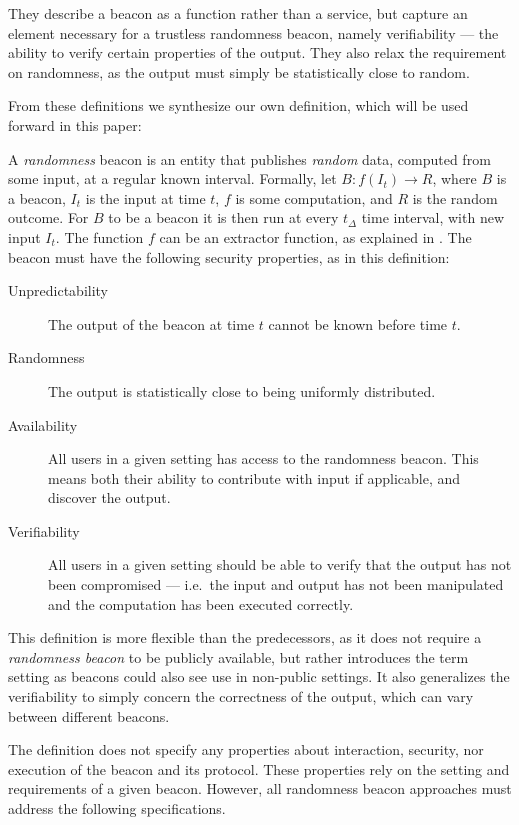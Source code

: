 They describe a beacon as a function rather than a service, but capture an element necessary for a trustless randomness beacon, namely verifiability --- the ability to verify certain properties of the output.
They also relax the requirement on randomness, as the output must simply be statistically close to random.

From these definitions we synthesize our own definition, which will be used forward in this paper:

A \emph{randomness} beacon is an entity that publishes \emph{random} data, computed from some input, at a regular known interval.
Formally, let $B: f(I_t) \rightarrow R$, where $B$ is a beacon, $I_t$ is the input at time $t$, $f$ is some computation, and $R$ is the random outcome.
For $B$ to be a beacon it is then run at every $t_\Delta$ time interval, with new input $I_t$.
The function $f$ can be an extractor function, as explained in .
The beacon must have the following security properties, as in this definition:

\begin{description}
    \item[Unpredictability] The output of the beacon at time $t$ cannot be known before time $t$.
    \item[Randomness] The output is statistically close to being uniformly distributed.
    \item[Availability] All users in a given setting has access to the randomness beacon.
       This means both their ability to contribute with input if applicable, and discover the output.
    \item[Verifiability] All users in a given setting should be able to verify that the output has not been compromised --- i.e.\ the input and output has not been manipulated and the computation has been executed correctly.
\end{description}

This definition is more flexible than the predecessors, as it does not require a \emph{randomness beacon} to be publicly available, but rather introduces the term setting as beacons could also see use in non-public settings.
It also generalizes the verifiability to simply concern the correctness of the output, which can vary between different beacons.

The definition does not specify any properties about interaction, security, nor execution of the beacon and its protocol.
These properties rely on the setting and requirements of a given beacon.
However, all randomness beacon approaches must address the following specifications.
